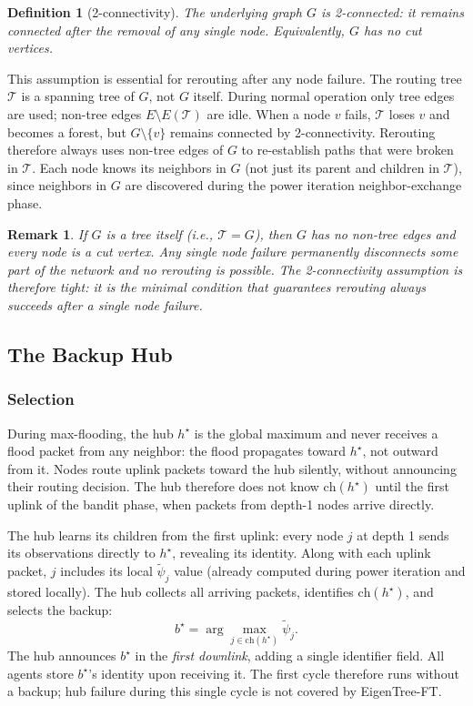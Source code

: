 \documentclass{article}
\newtheorem{definition}{Definition}
\newtheorem{remark}{Remark}
\newcommand{\merwft}{EigenTree-FT}
\begin{document}
\begin{definition}[2-connectivity]
\label{def:2conn}
    The underlying graph $G$ is \emph{2-connected}: it remains connected after the
    removal of any single node. Equivalently, $G$ has no cut vertices.
\end{definition}

This assumption is essential for rerouting after any node failure. The routing tree
$\mathcal{T}$ is a spanning tree of $G$, not $G$ itself. During normal operation only
tree edges are used; non-tree edges $E \setminus E(\mathcal{T})$ are idle. When a node
$v$ fails, $\mathcal{T}$ loses $v$ and becomes a forest, but $G \setminus \{v\}$ remains
connected by 2-connectivity. Rerouting therefore always uses non-tree edges of $G$ to
re-establish paths that were broken in $\mathcal{T}$. Each node knows its neighbors in
$G$ (not just its parent and children in $\mathcal{T}$), since neighbors in $G$ are
discovered during the power iteration neighbor-exchange phase.

\begin{remark}
    If $G$ is a tree itself (i.e., $\mathcal{T} = G$), then $G$ has no non-tree edges
    and every node is a cut vertex. Any single node failure permanently disconnects some
    part of the network and no rerouting is possible. The 2-connectivity assumption is
    therefore tight: it is the minimal condition that guarantees rerouting always succeeds
    after a single node failure.
\end{remark}

\subsection{The Backup Hub}
\label{sec:ft-backup}

\subsubsection{Selection}

During max-flooding, the hub $h^\star$ is the global maximum and never receives a flood
packet from any neighbor: the flood propagates toward $h^\star$, not outward from it.
Nodes route uplink packets toward the hub silently, without announcing their routing
decision. The hub therefore does not know $\mathrm{ch}(h^\star)$ until the first uplink
of the bandit phase, when packets from depth-1 nodes arrive directly.

The hub learns its children from the first uplink: every node $j$ at depth 1 sends its
observations directly to $h^\star$, revealing its identity. Along with each uplink packet,
$j$ includes its local $\tilde{\psi}_j$ value (already computed during power iteration
and stored locally). The hub collects all arriving packets, identifies
$\mathrm{ch}(h^\star)$, and selects the backup:
\[
    b^\star = \arg\max_{j \in \mathrm{ch}(h^\star)} \tilde{\psi}_j.
\]
The hub announces $b^\star$ in the \emph{first downlink}, adding a single identifier
field. All agents store $b^\star$'s identity upon receiving it. The first cycle therefore
runs without a backup; hub failure during this single cycle is not covered by \merwft.
\end{document}
